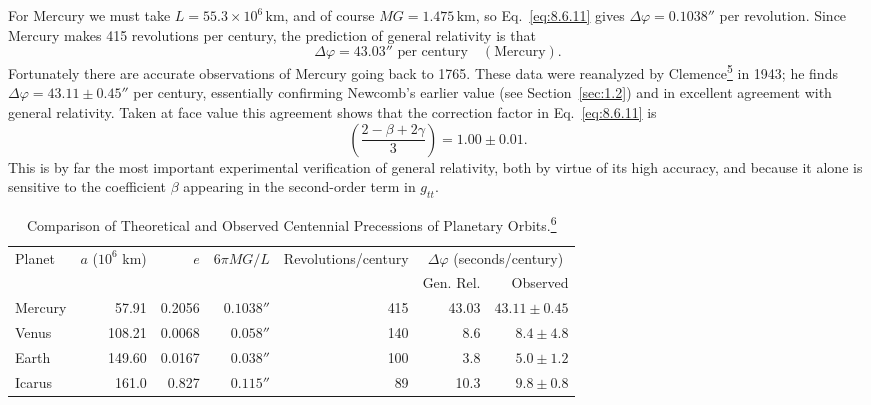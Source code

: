 For Mercury we must take \(L=55.3\times10^6\,\mathrm{km}\), and of course
\(MG=1.475\,\mathrm{km}\), so Eq.~\eqref{eq:8.6.11} gives
\(\Delta\varphi=0.1038''\) per revolution. Since Mercury makes 415
revolutions per century, the prediction of general relativity is that
\[
  \Delta\varphi=43.03''\text{ per century}\quad(\text{Mercury}).
\]
Fortunately there are accurate observations of Mercury going back to 1765.
These data were reanalyzed by
Clemence\hyperref[ch8-ref-5]{\textsuperscript{5}} in 1943; he finds
\(\Delta\varphi=43.11\pm0.45''\) per century, essentially confirming
Newcomb's earlier value (see Section~\ref{sec:1.2}) and in excellent
agreement with general relativity. Taken at face value this agreement shows
that the correction factor in Eq.~\eqref{eq:8.6.11} is
\[
  \left(\frac{2-\beta+2\gamma}{3}\right)=1.00\pm0.01.
\]
This is by far the most important experimental verification of general
relativity, both by virtue of its high accuracy, and because it alone is
sensitive to the coefficient \(\beta\) appearing in the second-order term
in \(g_{tt}\).

\begingroup
\renewcommand{\thetable}{8.3}
\begin{table}[tbp]
\centering
\caption{Comparison of Theoretical and Observed Centennial Precessions of
Planetary Orbits.\hyperref[ch8-ref-6]{\textsuperscript{6}}}
\label{tab:8.3}
\small
\begin{tabular}{@{}lrrrrrr@{}}
\toprule
Planet & \(a\) (\(10^6\) km) & \(e\) & \(6\pi MG/L\) &
Revolutions/century &
\multicolumn{2}{c}{\(\Delta\varphi\) (seconds/century)}\\
\cmidrule(l){6-7}
 & & & & & Gen. Rel. & Observed\\
\midrule
Mercury & 57.91 & 0.2056 & \(0.1038''\) & 415 & 43.03 &
  \(43.11\pm0.45\)\\
Venus & 108.21 & 0.0068 & \(0.058''\) & 140 & 8.6 &
  \(8.4\pm4.8\)\\
Earth & 149.60 & 0.0167 & \(0.038''\) & 100 & 3.8 &
  \(5.0\pm1.2\)\\
Icarus & 161.0 & 0.827 & \(0.115''\) & 89 & 10.3 &
  \(9.8\pm0.8\)\\
\bottomrule
\end{tabular}
\end{table}
\endgroup


